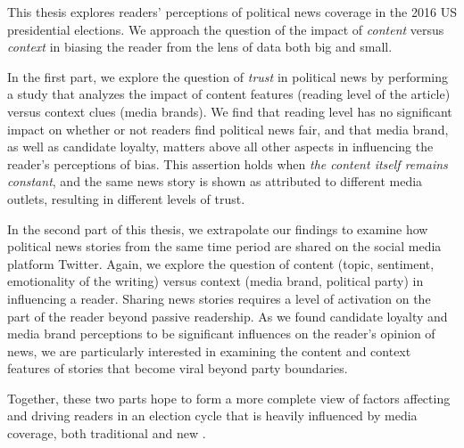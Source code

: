 \def\abstractpage{\cleardoublepage
\begin{center}{\large{\bf \@title} \\
by \\
\@author \\[\baselineskip]}
\par
\def\baselinestretch{1}\@normalsize
Submitted to the \@department, \\
\@school \\
on \@thesisdate, in partial fulfillment of the \\
requirements for the \@degreeword\ of \\
\@degree
\end{center}
\par
\begin{abstract}}

 
This thesis explores readers' perceptions of political news coverage in the 2016 US presidential elections. We approach the question of the impact of \emph{content} versus \emph{context} in biasing the reader from the lens of data both big and small.


In the first part, we explore the question of \emph{trust} in political news by performing a study that analyzes the impact of content features (reading level of the article) versus context clues (media brands). We find that reading level has no significant impact on whether or not readers find political news fair, and that media brand, as well as candidate loyalty, matters above all other aspects in influencing the reader's perceptions of bias. This assertion holds when \emph{the content itself remains constant}, and the same news story is shown as attributed to different media outlets, resulting in different levels of trust. 

In the second part of this thesis, we extrapolate our findings to examine how political news stories from the same time period are shared on the social media platform Twitter. Again, we explore the question of content (topic, sentiment, emotionality of the writing) versus context (media brand, political party) in influencing a reader. Sharing news stories requires a level of activation on the part of the reader beyond passive readership. As we found candidate loyalty and media brand perceptions to be significant influences on the reader's opinion of news, we are particularly interested in examining the content and context features of stories that become viral beyond party boundaries.

Together, these two parts hope to form a more complete view of factors affecting and driving readers in an election cycle that is heavily influenced by media coverage, both traditional and new .





















\afterpage{\blankpage}

 